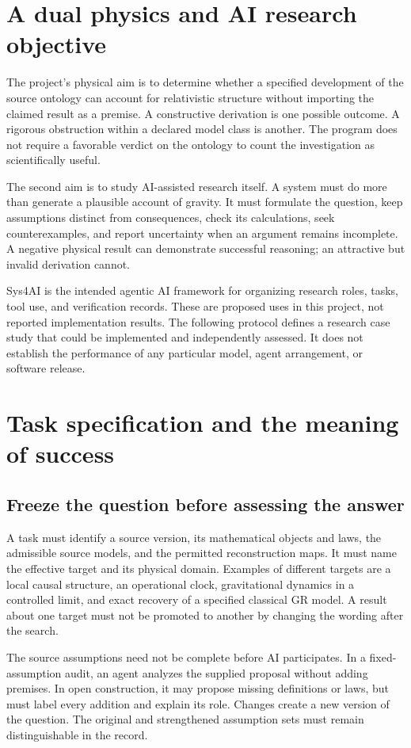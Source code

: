 \documentclass[11pt,oneside]{report}
\theoremstyle{remark}
\numberwithin{definition}{chapter}
\numberwithin{proposition}{chapter}
\numberwithin{remark}{chapter}
\begin{document}
\section{A dual physics and AI research objective}
The project's physical aim is to determine whether a specified development of the source ontology can account for relativistic structure without importing the claimed result as a premise. A constructive derivation is one possible outcome. A rigorous obstruction within a declared model class is another. The program does not require a favorable verdict on the ontology to count the investigation as scientifically useful.

The second aim is to study AI-assisted research itself. A system must do more than generate a plausible account of gravity. It must formulate the question, keep assumptions distinct from consequences, check its calculations, seek counterexamples, and report uncertainty when an argument remains incomplete. A negative physical result can demonstrate successful reasoning; an attractive but invalid derivation cannot.

Sys4AI is the intended agentic AI framework for organizing research roles, tasks, tool use, and verification records. These are proposed uses in this project, not reported implementation results. The following protocol defines a research case study that could be implemented and independently assessed. It does not establish the performance of any particular model, agent arrangement, or software release.

\section{Task specification and the meaning of success}
\subsection{Freeze the question before assessing the answer}
A task must identify a source version, its mathematical objects and laws, the admissible source models, and the permitted reconstruction maps. It must name the effective target and its physical domain. Examples of different targets are a local causal structure, an operational clock, gravitational dynamics in a controlled limit, and exact recovery of a specified classical GR model. A result about one target must not be promoted to another by changing the wording after the search.

The source assumptions need not be complete before AI participates. In a fixed-assumption audit, an agent analyzes the supplied proposal without adding premises. In open construction, it may propose missing definitions or laws, but must label every addition and explain its role. Changes create a new version of the question. The original and strengthened assumption sets must remain distinguishable in the record.
\end{document}
